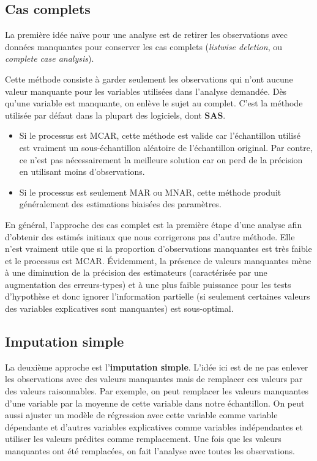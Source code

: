 \documentclass[
  11pt,
  letterpaper,
]{book}
\providecommand{\tightlist}{%
  \setlength{\itemsep}{0pt}\setlength{\parskip}{0pt}}
\theoremstyle{definition}
\theoremstyle{definition}
\theoremstyle{definition}
\theoremstyle{remark}
\begin{document}
\hypertarget{cas-complets}{%
\subsection{Cas complets}\label{cas-complets}}

La première idée naïve pour une analyse est de retirer les observations avec données manquantes pour conserver les cas complets (\emph{listwise deletion}, ou \emph{complete case analysis}).

Cette méthode consiste à garder seulement les observations qui n'ont aucune valeur manquante pour les variables utilisées dans l'analyse demandée. Dès qu'une variable est manquante, on enlève le sujet au complet. C'est la méthode utilisée par défaut dans la plupart des logiciels, dont \textbf{SAS}.

\begin{itemize}
\tightlist
\item
  Si le processus est MCAR, cette méthode est valide car l'échantillon utilisé est vraiment un sous-échantillon aléatoire de l'échantillon original. Par contre, ce n'est pas nécessairement la meilleure solution car on perd de la précision en utilisant moins d'observations.
\item
  Si le processus est seulement MAR ou MNAR, cette méthode produit généralement des estimations biaisées des paramètres.
\end{itemize}

En général, l'approche des cas complet est la première étape d'une analyse afin d'obtenir des estimés initiaux que nous corrigerons pas d'autre méthode. Elle n'est vraiment utile que si la proportion d'observations manquantes est très faible et le processus est MCAR. Évidemment, la présence de valeurs manquantes mène à une diminution de la précision des estimateurs (caractérisée par une augmentation des erreurs-types) et à une plus faible puissance pour les tests d'hypothèse et donc ignorer l'information partielle (si seulement certaines valeurs des variables explicatives sont manquantes) est sous-optimal.

\hypertarget{imputation-simple}{%
\subsection{Imputation simple}\label{imputation-simple}}

La deuxième approche est l'\textbf{imputation simple}. L'idée ici est de ne pas enlever les observations avec des valeurs manquantes mais de remplacer ces valeurs par des valeurs raisonnables. Par exemple, on peut remplacer les valeurs manquantes d'une variable par la moyenne de cette variable dans notre échantillon. On peut aussi ajuster un modèle de régression avec cette variable comme variable dépendante et d'autres variables explicatives comme variables indépendantes et utiliser les valeurs prédites comme remplacement. Une fois que les valeurs manquantes ont été remplacées, on fait l'analyse avec toutes les observations.
\end{document}
